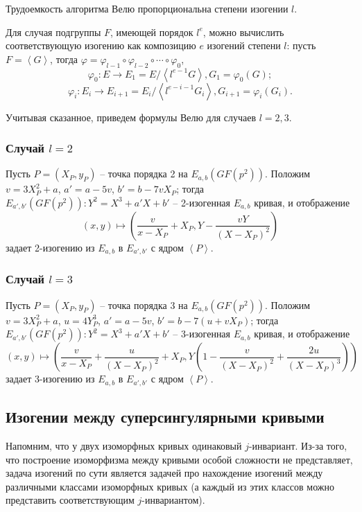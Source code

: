 \documentclass[a4paper,12pt]{article}
\newcommand{\tr}[1]{\left\langle #1\right\rangle}
\theoremstyle{definition}
\begin{document}
  Трудоемкость алгоритма Велю пропорциональна степени изогении $l$.
  
Для случая подгруппы $F$, имеющей порядок $l^e$, можно вычислить соответствующую изогению как композицию $e$ изогений степени $l$:
пусть $F=\tr{G}$, тогда $\varphi=\varphi_{l-1}\circ\varphi_{l-2}\circ\cdots\circ \varphi_0$, 
$$\varphi_0:E\to E_1=E/\tr{l^{e-1}G}, G_1=\varphi_0(G);$$
$$\varphi_i:E_i\to E_{i+1}=E_i/\tr{l^{e-i-1}G_i}, G_{i+1}=\varphi_i(G_i). $$
  
Учитывая сказанное, приведем формулы Велю для случаев $l=2,3$.

 \subsubsection*{Случай $l=2$}
Пусть  $P=(X_P,y_P)$ -- точка порядка 2 на $E_{a,b}(GF(p^2))$. Положим $v=3X_P^2+a$, $a'=a-5v$, $b'=b-7vX_P$;
тогда $E_{a',b'}(GF(p^2)): Y^2=X^3+a'X+b'$ -- 2-изогенная $E_{a,b}$ кривая, и  отображение
 $$
 (x,y)\mapsto \left(\frac{v}{x-X_P}+X_P, Y-\frac{vY}{(X-X_P)^2}\right) 
 $$
 задает 2-изогению из $E_{a,b}$ в $E_{a',b'}$ с ядром $\tr{P}$. 

   
 \subsubsection*{Случай $l=3$}
 Пусть $P=(X_P,y_P)$ -- точка порядка 3 на $E_{a,b}(GF(p^2))$. Положим $v=3X_P^2+a$, $u=4Y_P^3$, $a'=a-5v$, $b'=b-7(u+vX_P)$;
 тогда $E_{a',b'}(GF(p^2)): Y^2=X^3+a'X+b'$ -- 3-изогенная $E_{a,b}$ кривая, и
 отображение
 $$
 (x,y)\mapsto \left(\frac{v}{x-X_P}+\frac{u}{(X-X_P)^2}+X_P, Y\left(1-\frac{v}{(X-X_P)^2}+\frac{2u}{(X-X_P)^3}\right)\right) 
 $$
 задает 3-изогению из $E_{a,b}$ в $E_{a',b'}$ с ядром $\tr{P}$. 

  
  
\subsection{Изогении между суперсингулярными кривыми}

Напомним, что у двух изоморфных кривых одинаковый $j$-инвариант.
Из-за того, что построение изоморфизма между кривыми особой сложности не представляет, 
задача  изогений по сути является задачей про нахождение изогений между различными классами изоморфных кривых (а каждый из этих классов можно представить  соответствующим $j$-инвариантом).

\end{document}
